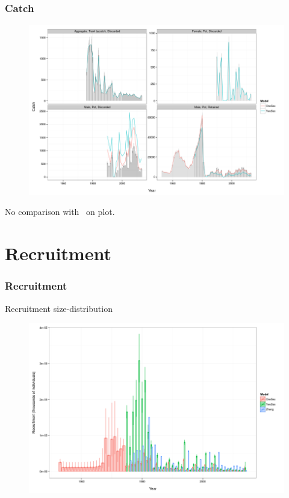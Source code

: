\documentclass{beamer}
\begin{document}

\begin{frame}
\frametitle{Catch}
\begin{figure}[!htbp]
  \centering
  \includegraphics[width=0.6\linewidth]{figure/fit_to_catch-1.png}
\end{figure}
No comparison with~\citet{zheng_bristol_2015} on plot.
\end{frame}


\section{Recruitment}


\begin{frame}
\frametitle{Recruitment}
Recruitment size-distribution
\begin{figure}[!htbp]
  \centering
  \includegraphics[width=0.6\linewidth]{figure/recruitment-1.png}
\end{figure}
\end{frame}
\end{document}
